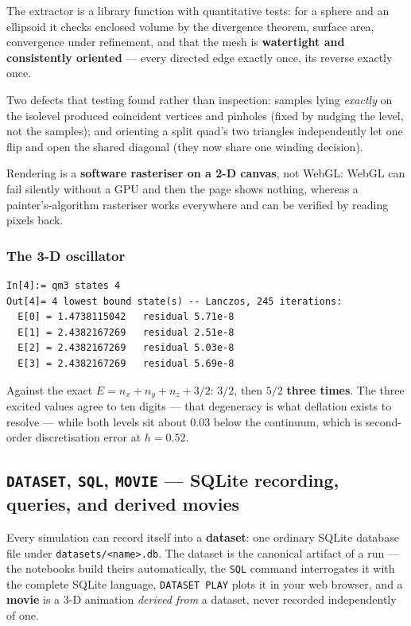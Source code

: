 \documentclass[11pt]{article}
\newcommand{\kw}[1]{\texttt{\uppercase{#1}}}
\newcommand{\code}[1]{\texttt{#1}}
\begin{document}
The extractor is a library function with quantitative tests: for a sphere
and an ellipsoid it checks enclosed volume by the divergence theorem,
surface area, convergence under refinement, and that the mesh is
\textbf{watertight and consistently oriented} --- every directed edge
exactly once, its reverse exactly once.

Two defects that testing found rather than inspection: samples lying
\emph{exactly} on the isolevel produced coincident vertices and pinholes
(fixed by nudging the level, not the samples); and orienting a split
quad's two triangles independently let one flip and open the shared
diagonal (they now share one winding decision).

Rendering is a \textbf{software rasteriser on a 2-D canvas}, not WebGL:
WebGL can fail silently without a GPU and then the page shows nothing,
whereas a painter's-algorithm rasteriser works everywhere and can be
verified by reading pixels back.

\subsubsection*{The 3-D oscillator}

\begin{lstlisting}
In[4]:= qm3 states 4
Out[4]= 4 lowest bound state(s) -- Lanczos, 245 iterations:
  E[0] = 1.4738115042   residual 5.71e-8
  E[1] = 2.4382167269   residual 2.51e-8
  E[2] = 2.4382167269   residual 5.03e-8
  E[3] = 2.4382167269   residual 5.69e-8
\end{lstlisting}

Against the exact $E=n_x+n_y+n_z+3/2$: $3/2$, then $5/2$ \textbf{three
times}. The three excited values agree to ten digits --- that degeneracy
is what deflation exists to resolve --- while both levels sit about 0.03
below the continuum, which is second-order discretisation error at
$h=0.52$.

\subsection{\kw{dataset}, \kw{sql}, \kw{movie} --- SQLite recording,
queries, and derived movies}
\label{sec:dataset}

Every simulation can record itself into a \textbf{dataset}: one
ordinary SQLite database file under \code{datasets/<name>.db}. The
dataset is the canonical artifact of a run --- the notebooks build
theirs automatically, the \kw{sql} command interrogates it with the
complete SQLite language, \kw{dataset play} plots it in your web
browser, and a \textbf{movie} is a 3-D animation \emph{derived from} a
dataset, never recorded independently of one.
\end{document}
